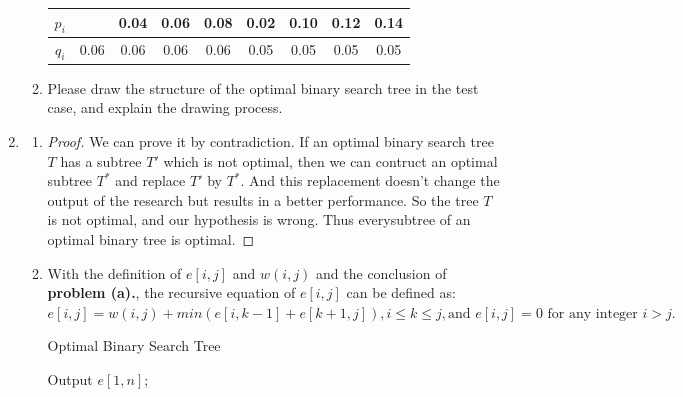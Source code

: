 \documentclass[12pt,a4paper]{article}
\makeatletter
\newtheorem*{solution}{Solution}
\theoremstyle{definition}
\renewenvironment{solution}[1][Solution] {\par\pushQED{\qed}\normalfont\topsep6\p@\@plus6\p@\relax\trivlist\item[\hskip\labelsep\bfseries#1\@addpunct{.}]\ignorespaces}{\popQED\endtrivlist\@endpefalse} \makeatother
\makeatother
\begin{document}
\begin{enumerate}
\begin{enumerate}
\begin{table}[H]
\begin{tabular}{|c|cccccccc|}
					\hline
					$ p_{i} $&&0.04&0.06&0.08&0.02&0.10&0.12&0.14\\
					\hline
					$ q_{i} $&0.06&0.06&0.06&0.06&0.05&0.05&0.05&0.05\\
					\hline
				\end{tabular}
			\end{table}
			\item Please draw the structure of the optimal binary search tree in the test case, and explain the drawing process.   
		\end{enumerate}
		    \begin{solution}
		        \begin{enumerate}
					\item 
					\begin{proof}
					        We can prove it by contradiction. If an optimal binary search tree $T$ has a subtree $T'$ which is not optimal, then we can contruct an optimal subtree $T^*$ and replace $T'$ by $T^*$. And this replacement doesn't change the output of the research but results in a better performance. So the tree $T$ is not optimal, and our hypothesis is wrong.
							Thus everysubtree of an optimal binary tree is optimal.
					\end{proof}
					\item With the definition of $e[i, j]$ and $w(i, j)$ and the conclusion of \textbf{problem (a).}, the recursive equation of $e[i,j]$ can be defined as:
					      \\$e[i,j]=w(i,j)+min(e[i,k-1]+e[k+1,j]),i\leqslant k\leqslant j, \text{and } e[i,j]=0 \text{ for any integer }i>j.$
						  \\ \begin{algorithm}[H]
							
							\BlankLine
							\caption{Optimal Binary Search Tree}\label{Alg-OBST}
				

							
							Output $e[1,n]$;
			

\end{algorithm}
\end{enumerate}
\end{solution}
\end{enumerate}
\end{document}
